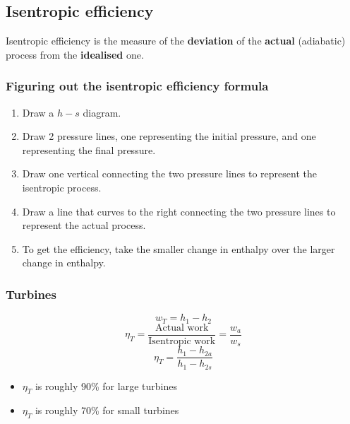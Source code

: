 \documentclass[11pt]{article}
\begin{document}
\subsection{Isentropic efficiency}
\label{sec:org3aaef8b}
Isentropic efficiency is the measure of the \textbf{deviation} of the \textbf{actual} (adiabatic) process from the \textbf{idealised} one.

\subsubsection{Figuring out the isentropic efficiency formula}
\label{sec:org4cb8a61}
\begin{enumerate}
\item Draw a \(h-s\) diagram.
\item Draw 2 pressure lines, one representing the initial pressure, and one representing the final pressure.
\item Draw one vertical connecting the two pressure lines to represent the isentropic process.
\item Draw a line that curves to the right connecting the two pressure lines to represent the actual process.
\item To get the efficiency, take the smaller change in enthalpy over the larger change in enthalpy.
\end{enumerate}

 \newpage

\subsubsection{Turbines}
\label{sec:org1af7c45}
\[w_T = h_1 - h_2\]
\[\eta_T = \frac{\text{Actual work}}{\text{Isentropic work}} = \frac{w_a}{w_s}\]
\[\eta_T = \frac{h_1 - h_{2a}}{h_1 - h_{2s}}\]

\begin{itemize}
\item \(\eta_T\) is roughly 90\% for large turbines
\item \(\eta_T\) is roughly 70\% for small turbines
\end{itemize}
\end{document}
